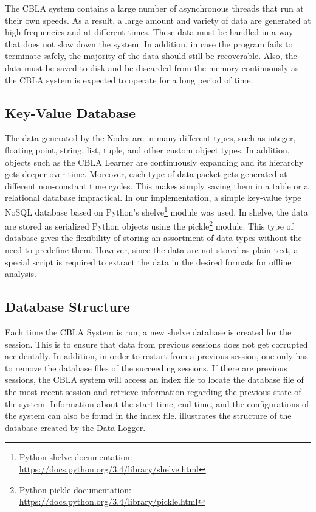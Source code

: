 The CBLA system contains a large number of asynchronous threads that run at their own speeds. As a result, a large amount and variety of data are generated at high frequencies and at different times. These data must be handled in a way that does not slow down the system. In addition, in case the program fails to terminate safely, the majority of the data should still be recoverable. Also, the data must be saved to disk and be discarded from the memory continuously as the CBLA system is expected to operate for a long period of time.

\subsection{Key-Value Database}
 
The data generated by the Nodes are in many different types, such as integer, floating point, string, list, tuple, and other custom object types. In addition, objects such as the CBLA Learner are continuously expanding and its hierarchy gets deeper over time. Moreover, each type of data packet gets generated at different non-constant time cycles. This makes simply saving them in a table or a relational database impractical. In our implementation, a simple key-value type NoSQL database based on Python's shelve\footnote{Python shelve documentation: \url{https://docs.python.org/3.4/library/shelve.html}} module was used. In shelve, the data are stored as serialized Python objects using the pickle\footnote{Python pickle documentation: \url{https://docs.python.org/3.4/library/pickle.html}} module. This type of database gives the flexibility of storing an assortment of data types without the need to predefine them. However, since the data are not stored as plain text, a special script is required to extract the data in the desired formats for offline analysis. 

\subsection{Database Structure}

Each time the CBLA System is run, a new shelve database is created for the session. This is to ensure that data from previous sessions does not get corrupted accidentally. In addition, in order to restart from a previous session, one only has to remove the database files of the succeeding sessions. If there are previous sessions, the CBLA system will access an index file to locate the database file of the most recent session and retrieve information regarding the previous state of the system. Information about the start time, end time, and the configurations of the system can also be found in the index file.  illustrates the structure of the database created by the Data Logger. 


